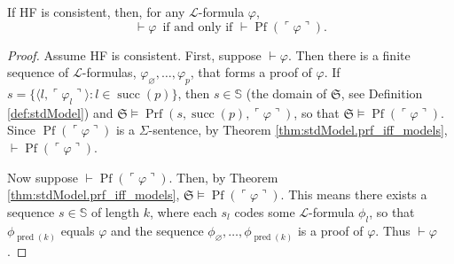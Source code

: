 \begin{theorem}
    \label{thm:prf_iff_prf_Pf_code}
    \leanok
    If HF is consistent, then, for any $\mathcal{L}$-formula $\varphi$,
    $$
    \vdash \varphi \,\text{ if and only if } \vdash \operatorname{Pf}(\ulcorner{\varphi}\urcorner).
    $$
\end{theorem}

\begin{proof}
    Assume HF is consistent. First, suppose $\vdash \varphi$.
    Then there is a finite sequence of $\mathcal{L}$-formulas, $\varphi_{\varnothing}, \ldots, 
    \varphi_p$, that forms a proof of $\varphi$.
    If $s = \{\langle l, \ulcorner{\varphi_l}\urcorner \rangle : l \in \operatorname{succ}(p) \}$,
    then $s \in \mathbb{S}$ (the domain of $\mathfrak{S}$, see Definition \ref{def:stdModel}) and
    $\mathfrak{S} \vDash \operatorname{Prf}(s, \operatorname{succ}(p), 
    \ulcorner{\varphi}\urcorner)$, 
    so that $\mathfrak{S} \vDash \operatorname{Pf}(\ulcorner{\varphi}\urcorner)$.
    Since $\operatorname{Pf}(\ulcorner{\varphi}\urcorner)$ is a $\Sigma$-sentence,
    by Theorem \ref{thm:stdModel.prf_iff_models}, 
    $\vdash \operatorname{Pf}(\ulcorner{\varphi}\urcorner)$.
    
    Now suppose $\vdash \operatorname{Pf}(\ulcorner{\varphi}\urcorner)$.
    Then, by Theorem \ref{thm:stdModel.prf_iff_models}, 
    $\mathfrak{S} \vDash \operatorname{Pf}(\ulcorner{\varphi}\urcorner)$.
    This means there exists a sequence $s \in \mathbb{S}$ of length $k$,
    where each $s_l$ codes some $\mathcal{L}$-formula $\phi_l$, 
    so that $\phi_{\operatorname{pred}(k)}$ equals $\varphi$ and the sequence
    $\phi_{\varnothing}, \ldots, \phi_{\operatorname{pred}(k)}$ is a proof of $\varphi$.
    Thus $\vdash \varphi$.
\end{proof}